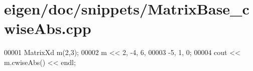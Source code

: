 \hypertarget{eigen_2doc_2snippets_2_matrix_base__cwise_abs_8cpp_source}{}\section{eigen/doc/snippets/\+Matrix\+Base\+\_\+cwise\+Abs.cpp}
\label{eigen_2doc_2snippets_2_matrix_base__cwise_abs_8cpp_source}

\begin{DoxyCode}
00001 MatrixXd m(2,3);
00002 m << 2, -4, 6,   
00003      -5, 1, 0;
00004 cout << m.cwiseAbs() << endl;
\end{DoxyCode}
